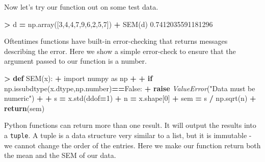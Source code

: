 \documentclass[
]{book}
\newenvironment{Shaded}{\begin{snugshade}}{\end{snugshade}}
\newcommand{\ControlFlowTok}[1]{\textcolor[rgb]{0.13,0.29,0.53}{\textbf{#1}}}
\newcommand{\DecValTok}[1]{\textcolor[rgb]{0.00,0.00,0.81}{#1}}
\newcommand{\FloatTok}[1]{\textcolor[rgb]{0.00,0.00,0.81}{#1}}
\newcommand{\ImportTok}[1]{#1}
\newcommand{\KeywordTok}[1]{\textcolor[rgb]{0.13,0.29,0.53}{\textbf{#1}}}
\newcommand{\NormalTok}[1]{#1}
\newcommand{\OperatorTok}[1]{\textcolor[rgb]{0.81,0.36,0.00}{\textbf{#1}}}
\newcommand{\PreprocessorTok}[1]{\textcolor[rgb]{0.56,0.35,0.01}{\textit{#1}}}
\newcommand{\StringTok}[1]{\textcolor[rgb]{0.31,0.60,0.02}{#1}}
\newcommand{\VariableTok}[1]{\textcolor[rgb]{0.00,0.00,0.00}{#1}}
\begin{document}
Now let's try our function out on some test data.

\begin{Shaded}
\begin{Highlighting}[]
\OperatorTok{\textgreater{}}\NormalTok{ d }\OperatorTok{=}\NormalTok{ np.array([}\DecValTok{3}\NormalTok{,}\DecValTok{4}\NormalTok{,}\DecValTok{4}\NormalTok{,}\DecValTok{7}\NormalTok{,}\DecValTok{9}\NormalTok{,}\DecValTok{6}\NormalTok{,}\DecValTok{2}\NormalTok{,}\DecValTok{5}\NormalTok{,}\DecValTok{7}\NormalTok{])}
\OperatorTok{+}\NormalTok{ SEM(d)}
\FloatTok{0.7412035591181296}
\end{Highlighting}
\end{Shaded}

Oftentimes functions have built-in error-checking that returns messages describing the error. Here we show a simple error-check to ensure that the argument passed to our function is a number.

\begin{Shaded}
\begin{Highlighting}[]
\OperatorTok{\textgreater{}} \KeywordTok{def}\NormalTok{ SEM(x):}
\OperatorTok{+}   \ImportTok{import}\NormalTok{ numpy }\ImportTok{as}\NormalTok{ np}
\OperatorTok{+}   
\OperatorTok{+}   \ControlFlowTok{if}\NormalTok{ np.issubdtype(x.dtype,np.number)}\OperatorTok{==}\VariableTok{False}\NormalTok{:}
\OperatorTok{+}     \ControlFlowTok{raise} \PreprocessorTok{ValueError}\NormalTok{(}\StringTok{"Data must be numeric"}\NormalTok{)}
\OperatorTok{+}   
\OperatorTok{+}\NormalTok{   s }\OperatorTok{=}\NormalTok{ x.std(ddof}\OperatorTok{=}\DecValTok{1}\NormalTok{) }
\OperatorTok{+}\NormalTok{   n }\OperatorTok{=}\NormalTok{ x.shape[}\DecValTok{0}\NormalTok{] }
\OperatorTok{+}\NormalTok{   sem }\OperatorTok{=}\NormalTok{ s }\OperatorTok{/}\NormalTok{ np.sqrt(n) }
\OperatorTok{+}   \ControlFlowTok{return}\NormalTok{(sem) }
\end{Highlighting}
\end{Shaded}

Python functions can return more than one result. It will output the results into a \texttt{tuple}. A tuple is a data structure very similar to a list, but it is immutable - we cannot change the order of the entries. Here we make our function return both the mean and the SEM of our data.
\end{document}
